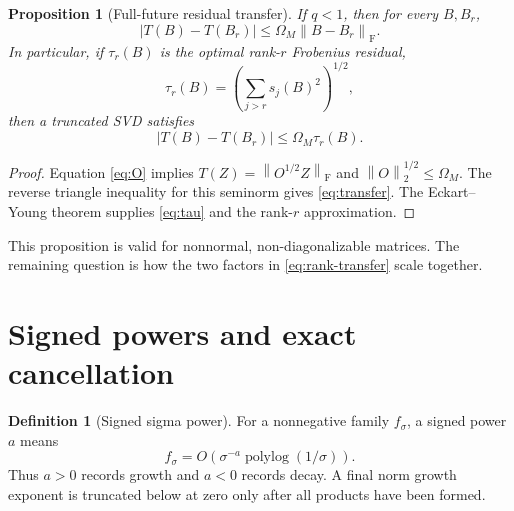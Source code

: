 \documentclass[11pt]{article}
\newtheorem{proposition}[theorem]{Proposition}
\theoremstyle{definition}
\newtheorem{definition}[theorem]{Definition}
\theoremstyle{remark}
\newcommand{\norm}[1]{\left\lVert#1\right\rVert}
\newcommand{\F}{\mathrm F}
\begin{document}
\begin{proposition}[Full-future residual transfer]
 \label{prop:transfer}
 If $q<1$, then for every $B,B_r$,
 \begin{equation}
 \left|T(B)-T(B_r)\right|
 \le \Omega_M\norm{B-B_r}_{\F}.
 \label{eq:transfer}
 \end{equation}
 In particular, if $\tau_r(B)$ is the optimal rank-$r$ Frobenius residual,
 \begin{equation}
 \tau_r(B)=\left(\sum_{j>r}s_j(B)^2\right)^{1/2},
 \label{eq:tau}
 \end{equation}
 then a truncated SVD satisfies
 \begin{equation}
 \left|T(B)-T(B_r)\right|\le\Omega_M\tau_r(B).
 \label{eq:rank-transfer}
 \end{equation}
\end{proposition}

\begin{proof}
 Equation \eqref{eq:O} implies
 $T(Z)=\norm{O^{1/2}Z}_{\F}$ and
 $\norm O_2^{1/2}\le\Omega_M$.  The reverse triangle inequality for this
 seminorm gives \eqref{eq:transfer}.  The Eckart--Young theorem supplies
 \eqref{eq:tau} and the rank-$r$ approximation.
\end{proof}

This proposition is valid for nonnormal, non-diagonalizable matrices.  The
remaining question is how the two factors in \eqref{eq:rank-transfer} scale
together.

\section{Signed powers and exact cancellation}
\label{sec:powers}

\begin{definition}[Signed sigma power]
 For a nonnegative family $f_\sigma$, a signed power $a$ means
 \[
 f_\sigma=O\!\left(\sigma^{-a}\operatorname{polylog}(1/\sigma)\right).
 \]
 Thus $a>0$ records growth and $a<0$ records decay.  A final norm growth
 exponent is truncated below at zero only after all products have been
 formed.
\end{definition}
\end{document}
